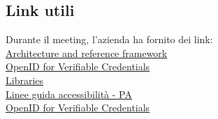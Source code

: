  \subsection{Link utili}
 Durante il meeting, l'azienda ha fornito dei link:\\
\href{https://github.com/eu-digital-identity-wallet/architecture-and-reference-framework/releases}{Architecture and reference framework}\\
\href{https://openid.net/openid4vc/}{OpenID for Verifiable Credentials}\\
\href{https://2022.stateofjs.com/en-US/libraries/}{Libraries}\\
\href{https://www.agid.gov.it/it/design-servizi/accessibilita/linee-guida-accessibilita-pa#:~:text=AGID%20ha%20emanato%20le%20Linee%20Guida%20sull%27accessibilit%C3%A0%20degli,alle%20prescrizioni%20in%20materia%20di%20accessibilit%C3%A0%3B%20Altri%20elementi}{Linee guida accessibilità - PA}\\
\href{https://openid.net/wordpress-content/uploads/2022/06/OIDF-Whitepaper_OpenID-for-Verifiable-Credentials-V2_2022-06-23.pdf}{OpenID for Verifiable Credentials}
